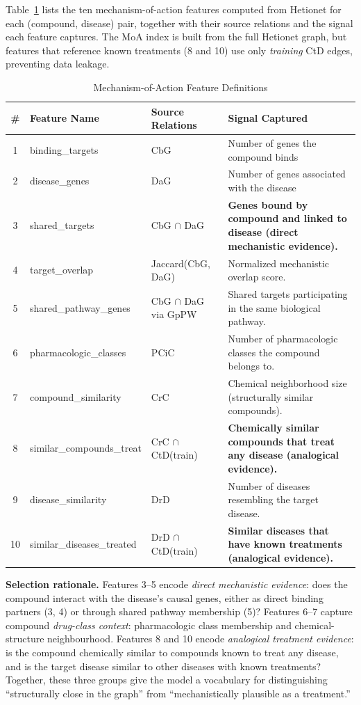 \documentclass[10pt,twocolumn]{article}
\begin{document}
Table~\ref{tab:moa} lists the ten mechanism-of-action features computed from Hetionet for each (compound, disease) pair, together with their source relations and the signal each feature captures. The MoA index is built from the full Hetionet graph, but features that reference known treatments (8 and 10) use only \emph{training} CtD edges, preventing data leakage.

\begin{table}[t]
\centering
\caption{Mechanism-of-Action Feature Definitions}
\label{tab:moa}
\small
\setlength{\tabcolsep}{4pt}
\begin{tabularx}{\textwidth}{@{}c >{\ttfamily\raggedright\arraybackslash}p{} >{\raggedright\arraybackslash}p{} X@{}}
\toprule
\textbf{\#} & \textbf{Feature Name} & \textbf{Source Relations} & \textbf{Signal Captured} \\
\midrule
1 & binding\_targets & CbG & Number of genes the compound binds \\
2 & disease\_genes & DaG & Number of genes associated with the disease \\
3 & shared\_targets & CbG $\cap$ DaG & \textbf{Genes bound by compound and linked to disease (direct mechanistic evidence).} \\
4 & target\_overlap & Jaccard(CbG, DaG) & Normalized mechanistic overlap score. \\
5 & shared\_pathway\_genes & CbG $\cap$ DaG via GpPW & Shared targets participating in the same biological pathway. \\
6 & pharmacologic\_classes & PCiC & Number of pharmacologic classes the compound belongs to. \\
7 & compound\_similarity & CrC & Chemical neighborhood size (structurally similar compounds). \\
8 & similar\_compounds\_treat & CrC $\cap$ CtD(train) & \textbf{Chemically similar compounds that treat any disease (analogical evidence).} \\
9 & disease\_similarity & DrD & Number of diseases resembling the target disease. \\
10 & similar\_diseases\_treated & DrD $\cap$ CtD(train) & \textbf{Similar diseases that have known treatments (analogical evidence).} \\
\bottomrule
\end{tabularx}
\end{table}

\noindent\textbf{Selection rationale.} Features 3--5 encode \emph{direct mechanistic evidence}: does the compound interact with the disease's causal genes, either as direct binding partners (3, 4) or through shared pathway membership (5)? Features 6--7 capture compound \emph{drug-class context}: pharmacologic class membership and chemical-structure neighbourhood. Features 8 and 10 encode \emph{analogical treatment evidence}: is the compound chemically similar to compounds known to treat any disease, and is the target disease similar to other diseases with known treatments? Together, these three groups give the model a vocabulary for distinguishing ``structurally close in the graph'' from ``mechanistically plausible as a treatment.''
\end{document}

